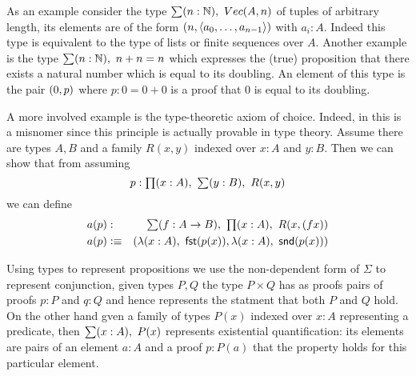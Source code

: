 

As an example consider the type $\sm{n:\Nat}\Vect(A,n)$ of tuples of
arbitrary length, its elements are of the form
$( n,\langle a_0,\dots,a_{n-1}\rangle)$ with $a_i : A$. Indeed this type is
equivalent to the type of lists or finite sequences over $A$. Another example is the type
$\sm{n:\Nat}n+n = n$ which expresses the (true) proposition that
there exists a natural number which is equal to its doubling. An
element of this type is the pair $( 0,p)$ where $p: 0 = 0+0$ is a
proof that $0$ is equal to its doubling.

A more involved example is the type-theoretic axiom of choice. Indeed,
in this is a misnomer since this principle is actually provable in
type theory. Assume
there are types $A,B$ and a family $R(x,y)$ indexed over $x:A$ and
$y:B$. Then we can show that from assuming 
\[p : \prd{x:A}\sm{y :B}R(x,y)\] 
we can define 
\begin{eqnarray*}
a(p) & : & \sm{f : A \to B} \prd{x:A} R(x,(fx)) \\
a(p) & \defeq & (\lam{x:A} \fst(p(x)),\lam{x:A} \snd(p(x)))
\end{eqnarray*}

Using types to represent propositions we use the non-dependent
form of $\Sigma$ to represent conjunction, given types $P,Q$ the type
$P \times Q$ has as proofs pairs of proofs $p:P$ and $q:Q$ and hence
represents the statment that both $P$ and $Q$ hold. On the other hand
gven a family of types $P(x)$ indexed over $x:A$ representing a
predicate, then $\sm{x:A} P(x)$ represents existential quantification:
its elements are pairs of an element $a : A$ and a proof $p : P(a)$
that the property holds for this particular element.

